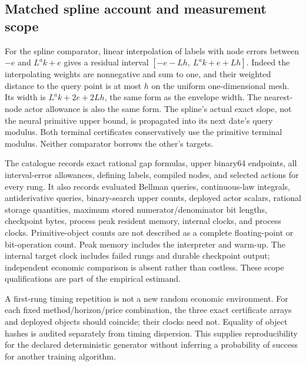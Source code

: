 \subsection{Matched spline account and measurement scope}
For the spline comparator, linear interpolation of labels with node errors between $-e$ and $L^ak+e$ gives a residual interval
$[-e-Lh,\ L^ak+e+Lh]$.
Indeed the interpolating weights are nonnegative and sum to one, and their weighted distance to the query point is at most $h$ on the uniform one-dimensional mesh. Its width is $L^ak+2e+2Lh$, the same form as the envelope width. The nearest-node actor allowance is also the same form. The spline's actual exact slope, not the neural primitive upper bound, is propagated into its next date's query modulus. Both terminal certificates conservatively use the primitive terminal modulus. Neither comparator borrows the other's targets.

The catalogue records exact rational gap formulas, upper binary64 endpoints, all interval-error allowances, defining labels, compiled nodes, and selected actions for every rung. It also records evaluated Bellman queries, continuous-law integrals, antiderivative queries, binary-search upper counts, deployed actor scalars, rational storage quantities, maximum stored numerator/denominator bit lengths, checkpoint bytes, process peak resident memory, internal clocks, and process clocks. Primitive-object counts are not described as a complete floating-point or bit-operation count. Peak memory includes the interpreter and warm-up. The internal target clock includes failed rungs and durable checkpoint output; independent economic comparison is absent rather than costless. These scope qualifications are part of the empirical estimand.

A first-rung timing repetition is not a new random economic environment. For each fixed method/horizon/price combination, the three exact certificate arrays and deployed objects should coincide; their clocks need not. Equality of object hashes is audited separately from timing dispersion. This supplies reproducibility for the declared deterministic generator without inferring a probability of success for another training algorithm.
